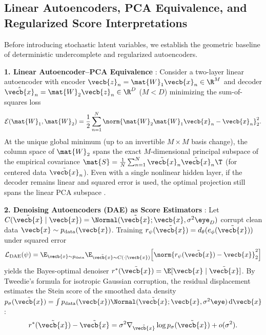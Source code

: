 \documentclass[../../../../master.tex]{subfiles}
\begin{document}
\subsection{Linear Autoencoders, PCA Equivalence, and Regularized Score Interpretations}

Before introducing stochastic latent variables, we establish the geometric baseline of deterministic undercomplete and regularized autoencoders.

\begin{coremath}
\textbf{1. Linear Autoencoder--PCA Equivalence} : Consider a two-layer linear autoencoder with encoder $\vecb{z}_n = \mat{W}_1\vecb{x}_n \in \R^M$ and decoder $\hat{\vecb{x}}_n = \mat{W}_2\vecb{z}_n \in \R^D$ ($M < D$) minimizing the sum-of-squares loss
\begin{equation}\label{eq:vae:linear_ae}
  \mathcal{E}(\mat{W}_1, \mat{W}_2) = \frac{1}{2}\sum_{n=1}^N \norm{\mat{W}_2 \mat{W}_1 \vecb{x}_n - \vecb{x}_n}_2^2.
\end{equation}
At the unique global minimum (up to an invertible $M \times M$ basis change), the column space of $\mat{W}_2$ spans the exact $M$-dimensional principal subspace of the empirical covariance $\mat{S} = \frac{1}{N}\sum_{n=1}^N \tilde{\vecb{x}}_n \tilde{\vecb{x}}_n\T$ (for centered data $\tilde{\vecb{x}}_n$). Even with a single nonlinear hidden layer, if the decoder remains linear and squared error is used, the optimal projection still spans the linear PCA subspace  .

\textbf{2. Denoising Autoencoders (DAE) as Score Estimators} : Let $C(\tilde{\vecb{x}} \mid \vecb{x}) = \Normal(\tilde{\vecb{x}}; \vecb{x}, \sigma^2 \eye_D)$ corrupt clean data $\vecb{x} \sim p_{\mathrm{data}}(\vecb{x})$. Training $r_\psi(\tilde{\vecb{x}}) = d_\theta(e_\phi(\tilde{\vecb{x}}))$ under squared error
\begin{equation}\label{eq:vae:dae_loss}
  \mathcal{L}_{\mathrm{DAE}}(\psi) = \E_{\vecb{x} \sim p_{\mathrm{data}}} \E_{\tilde{\vecb{x}} \sim C(\cdot\mid\vecb{x})}\!\left[ \norm{r_\psi(\tilde{\vecb{x}}) - \vecb{x}}_2^2 \right]
\end{equation}
yields the Bayes-optimal denoiser $r^*(\tilde{\vecb{x}}) = \E[\vecb{x} \mid \tilde{\vecb{x}}]$. By Tweedie's formula for isotropic Gaussian corruption, the residual displacement estimates the Stein score of the smoothed data density $p_\sigma(\tilde{\vecb{x}}) = \int p_{\mathrm{data}}(\vecb{x})\Normal(\tilde{\vecb{x}};\vecb{x},\sigma^2\eye)\,\mathrm{d}\vecb{x}$:
\begin{equation}\label{eq:vae:dae_score}
  r^*(\tilde{\vecb{x}}) - \tilde{\vecb{x}} = \sigma^2 \nabla_{\tilde{\vecb{x}}} \log p_\sigma(\tilde{\vecb{x}}) + o(\sigma^2).
\end{equation}


\end{coremath}
\end{document}

